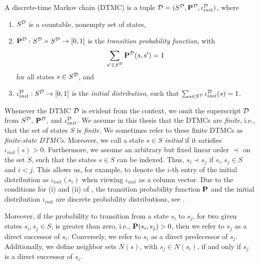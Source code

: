\begin{definition}[DTMC]\label{def:DTMCs}
    A discrete-time Markov chain (DTMC) is a tuple $\mathcal{D} = (S^{\mathcal{D}}, \mathbf{P}^{\mathcal{D}},\iota_{init}^{\mathcal{D}})$, where
    \begin{enumerate}[label=(\roman*)]
        \item $S^{\mathcal{D}}$ is a countable, nonempty set of states,
        \item $\mathbf{P}^{\mathcal{D}}: S^{\mathcal{D}} \times S^{\mathcal{D}} \rightarrow [0,1]$ is the \textit{transition probability function}, with 
        \[\sum_{s'\in S^{\mathcal{D}}}\mathbf{P}^{\mathcal{D}}(s,s') = 1\]
        for all states $s \in S^{\mathcal{D}}$, and
        \item $\iota_{init}^{\mathcal{D}}: S^{\mathcal{D}} \rightarrow [0,1]$ is the \textit{initial distribution}, such that $\sum_{s\in S^{\mathcal{D}}}\iota_{init}^{\mathcal{D}}(s)=1$.
    \end{enumerate}
\end{definition}
Whenever the DTMC $\mathcal{D}$ is evident from the context, we omit the superscript $\mathcal{D}$ from $S^{\mathcal{D}}$, $\mathbf{P}^{\mathcal{D}}$, and $\iota_{init}^{\mathcal{D}}$.
We assume in this thesis that the DTMCs are \textit{finite}, i.e., that the set of states $S$ is \textit{finite}. We sometimes refer to these finite DTMCs as \textit{finite-state DTMCs}. Moreover, we call a state $s\in S$ \textit{initial} if it satisfies $\iota_{init}(s) > 0$. Furthermore, we assume an arbitrary but fixed linear order $\prec$ on the set $S$, such that the states $s\in S$ can be indexed. Thus, $s_i \prec s_j$ if $s_i,s_j \in S$ and $i < j$. This allows us, for example, to denote the $i$-th entry of the initial distribution as $\iota_{init}(s_i)$ when viewing $\iota_{init}$ as a column vector.
Due to the conditions for (i) and (ii) of , the transition probability function $\mathbf{P}$ and the initial distribution $\iota_{init}$ are discrete probability distributions, see .

Moreover, if the probability to transition from a state $s_i$ to $s_j$, for two given states $s_i,s_j \in S$, is greater than zero, i.e., $\mathbf{P}(s_i,s_j)>0$, then we refer to $s_j$ as a direct successor of $s_i$. Conversely, we refer to $s_i$ as a direct predecessor of $s_j$. Additionally, we define neighbor sets $N(s)$, with $s_j \in N(s_i)$, if and only if $s_j$ is a direct successor of $s_i$.



